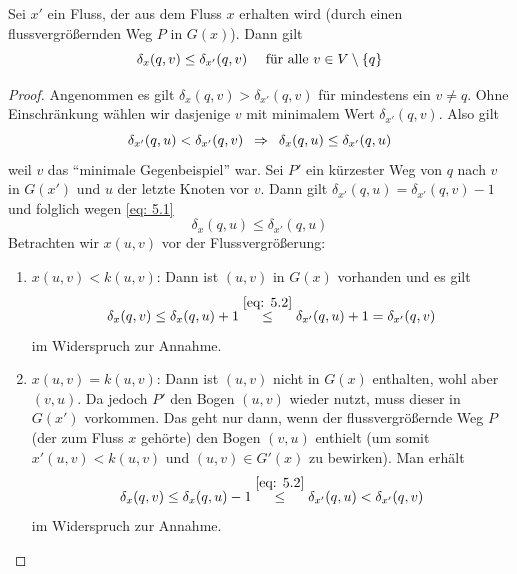 \begin{lemma}
	\label{lemma: 5.5}
	Sei $x'$ ein Fluss, der aus dem Fluss $x$ erhalten wird (durch einen flussvergrößernden Weg $P$ in $G(x)$). Dann gilt
	\begin{equation*}
		\delta_x(q,v) \le \delta_{x'}(q,v) \quad \text{ für alle } v \in V \setminus \left\{ q \right\}
	\end{equation*}
\end{lemma}
\begin{proof}
	Angenommen es gilt $\delta_x(q,v) > \delta_{x'}(q,v)$ für mindestens ein $v \neq q$. Ohne Einschränkung wählen wir dasjenige $v$ mit minimalem Wert $\delta_{x'}(q,v)$. Also gilt
	\begin{equation}
		\delta_{x'}(q,u) < \delta_{x'}(q,v) \enskip \Rightarrow \enskip \delta_x(q,u) \le \delta_{x'}(q,u)
		\label{eq: 5.1}
	\end{equation}
	weil $v$ das \enquote{minimale Gegenbeispiel} war. Sei $P'$ ein kürzester Weg von $q$ nach $v$ in $G(x')$ und $u$ der letzte Knoten vor $v$. Dann gilt $\delta_{x'}(q,u) = \delta_{x'}(q,v) - 1$ und folglich wegen \eqref{eq: 5.1}
	\begin{equation}
		\delta_x(q,u) \le \delta_{x'}(q,u)
		\label{eq: 5.2}
	\end{equation}
	Betrachten wir $x(u,v)$ vor der Flussvergrößerung:
	\begin{enumerate}[label=(\alph*), nolistsep]
		\item $x(u,v) < k(u,v)$: Dann ist $(u,v)$ in $G(x)$ vorhanden und es gilt
		\begin{equation*}
			\delta_x(q,v) \le \delta_x(q,u) + 1 \overset{\eqref{eq: 5.2}}{\le} \delta_{x'}(q,u) + 1 = \delta_{x'}(q,v)
		\end{equation*}
		im Widerspruch zur Annahme.
		\item $x(u,v) = k(u,v)$: Dann ist $(u,v)$ nicht in $G(x)$ enthalten, wohl aber $(v,u)$. Da jedoch $P'$ den Bogen $(u,v)$ wieder nutzt, muss dieser in $G(x')$ vorkommen. Das geht nur dann, wenn der flussvergrößernde Weg $P$ (der zum Fluss $x$ gehörte) den Bogen $(v,u)$ enthielt (um somit $x'(u,v) < k(u,v)$ und $(u,v) \in G'(x)$ zu bewirken). Man erhält
		\begin{equation*}
			\delta_x(q,v) \le \delta_x(q,u) - 1 \overset{\eqref{eq: 5.2}}{\le} \delta_{x'}(q,u) < \delta_{x'}(q,v)
		\end{equation*}
		im Widerspruch zur Annahme.
	\end{enumerate}
\end{proof}

